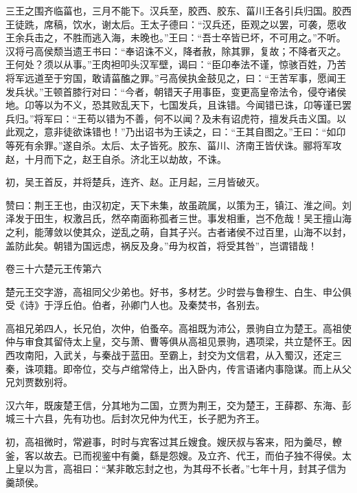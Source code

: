 \documentclass[12pt,UTF8]{ctexbook}
\begin{document}
三王之围齐临菑也，三月不能下。汉兵至，胶西、胶东、菑川王各引兵归国。胶西王徒跣，席稿，饮水，谢太后。王太子德曰：“汉兵还，臣观之以罢，可袭，愿收王余兵击之，不胜而逃入海，未晚也。”王曰：“吾士卒皆已坏，不可用之。”不听。汉将弓高侯颓当遗王书曰：“奉诏诛不义，降者赦，除其罪，复故；不降者灭之。王何处？须以从事。”王肉袒叩头汉军壁，谒曰：“臣卬奉法不谨，惊骇百姓，乃苦将军远道至于穷国，敢请菑醢之罪。”弓高侯执金鼓见之，曰：“王苦军事，愿闻王发兵状。”王顿首膝行对曰：“今者，朝错天子用事臣，变更高皇帝法令，侵夺诸侯地。卬等以为不义，恐其败乱天下，七国发兵，且诛错。今闻错已诛，卬等谨已罢兵归。”将军曰：“王苟以错为不善，何不以闻？及未有诏虎符，擅发兵击义国。以此观之，意非徒欲诛错也！”乃出诏书为王读之，曰：“王其自图之。”王曰：“如卬等死有余罪。”遂自杀。太后、太子皆死。胶东、菑川、济南王皆伏诛。郦将军攻赵，十月而下之，赵王自杀。济北王以劫故，不诛。



初，吴王首反，并将楚兵，连齐、赵。正月起，三月皆破灭。



赞曰：荆王王也，由汉初定，天下未集，故虽疏属，以策为王，镇江、淮之间。刘泽发于田生，权激吕氏，然卒南面称孤者三世。事发相重，岂不危哉！吴王擅山海之利，能薄敛以使其众，逆乱之萌，自其子兴。古者诸侯不过百里，山海不以封，盖防此矣。朝错为国远虑，祸反及身。”毋为权首，将受其咎”，岂谓错哉！





卷三十六楚元王传第六



楚元王交字游，高祖同父少弟也。好书，多材艺。少时尝与鲁穆生、白生、申公俱受《诗》于浮丘伯。伯者，孙卿门人也。及秦焚书，各别去。



高祖兄弟四人，长兄伯，次仲，伯蚤卒。高祖既为沛公，景驹自立为楚王。高祖使仲与审食其留侍太上皇，交与萧、曹等俱从高祖见景驹，遇项梁，共立楚怀王。因西攻南阳，入武关，与秦战于蓝田。至霸上，封交为文信君，从入蜀汉，还定三秦，诛项籍。即帝位，交与卢绾常侍上，出入卧内，传言语诸内事隐谋。而上从父兄刘贾数别将。



汉六年，既废楚王信，分其地为二国，立贾为荆王，交为楚王，王薛郡、东海、彭城三十六县，先有功也。后封次兄仲为代王，长子肥为齐王。



初，高祖微时，常避事，时时与宾客过其丘嫂食。嫂厌叔与客来，阳为羹尽，轑釜，客以故去。已而视鉴中有羹，繇是怨嫂。及立齐、代王，而伯子独不得侯。太上皇以为言，高祖曰：“某非敢忘封之也，为其母不长者。”七年十月，封其子信为羹颉侯。
\end{document}
